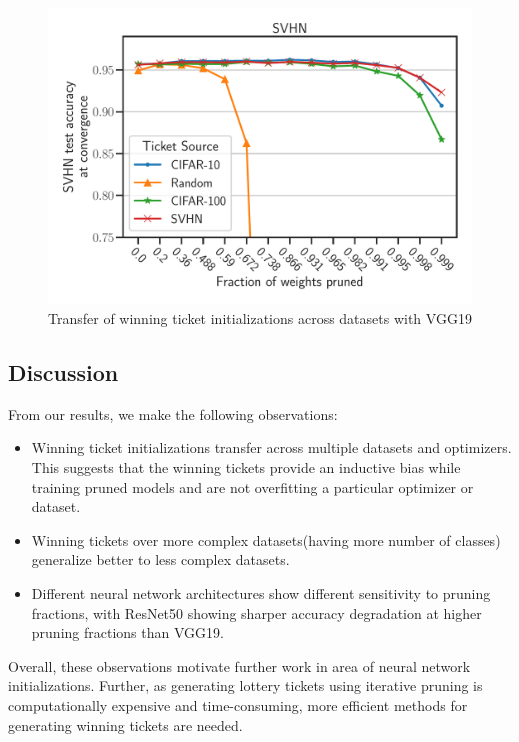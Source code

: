 \documentclass{article}
\begin{document}
\begin{figure}[]
\begin{minipage}{.497\textwidth}
    \includegraphics[width=\textwidth]{plots/Exp2_VGG_SVHN_N.pdf}
    \end{minipage}
    \caption{Transfer of winning ticket initializations across datasets with VGG19}
    \label{fig:exp2_vgg}
\end{figure}

\subsection{Discussion}
 From our results, we make the following observations:
\begin{itemize}
    \item Winning ticket initializations transfer across multiple datasets and optimizers. This suggests that the winning tickets provide an inductive bias while training pruned models  and are not overfitting a particular optimizer or dataset.
    \item Winning tickets over more complex datasets(having more number of classes) generalize better to less complex datasets.
    \item  Different neural network architectures show different sensitivity to pruning fractions, with ResNet50 showing sharper accuracy degradation at higher pruning fractions than VGG19.
\end{itemize}
 Overall, these observations motivate further work in area of neural network initializations. Further, as generating lottery tickets using iterative pruning is computationally expensive and time-consuming, more efficient methods for generating winning tickets are needed.
\end{document}
